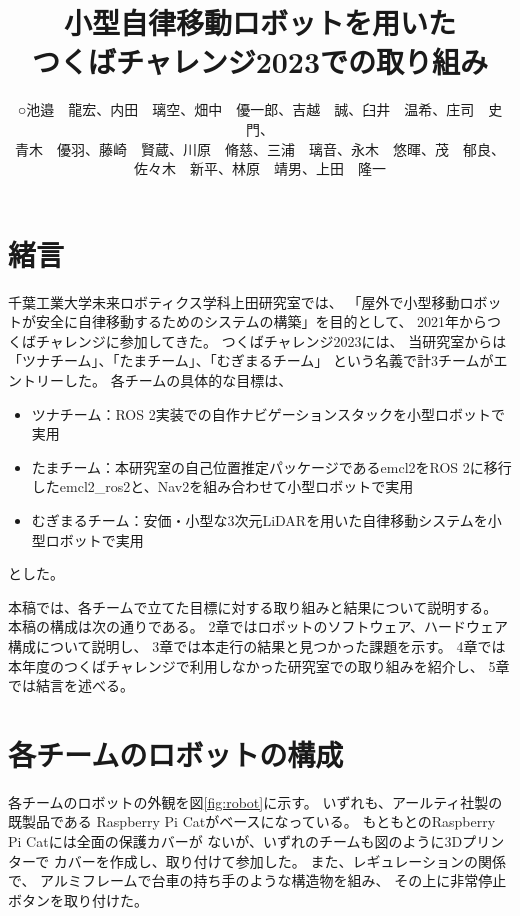 \documentclass[twocolumn,9pt]{jsproceedings}
\title{小型自律移動ロボットを用いた\\つくばチャレンジ2023での取り組み}
\author{○池邉　龍宏\authorrefmark{2}、内田　璃空\authorrefmark{2}、畑中　優一郎\authorrefmark{2}、吉越　誠\authorrefmark{1}、臼井　温希\authorrefmark{1}、庄司　史門\authorrefmark{1}、
\\青木　優羽\authorrefmark{1}、藤崎　賢蔵\authorrefmark{1}、川原　脩慈\authorrefmark{1}、三浦　璃音\authorrefmark{1}、永木　悠暉\authorrefmark{1}、茂　郁良\authorrefmark{1}、
\\佐々木　新平\authorrefmark{1}、林原　靖男\authorrefmark{1}、上田　隆一\authorrefmark{1}}
\affiliation{千葉工業大学 未来ロボティクス学科 ツナチーム/たまチーム/むぎまるチーム}
\begin{document}
\maketitle


\section{緒言}

千葉工業大学未来ロボティクス学科上田研究室では、
「屋外で小型移動ロボットが安全に自律移動するためのシステムの構築」を目的として、
2021年からつくばチャレンジに参加してきた。
つくばチャレンジ2023には、
当研究室からは「ツナチーム」、「たまチーム」、「むぎまるチーム」
という名義で計3チームがエントリーした。
各チームの具体的な目標は、
\begin{itemize}
  \item ツナチーム：ROS 2実装での自作ナビゲーションスタックを小型ロボットで実用
  \item たまチーム：本研究室の自己位置推定パッケージであるemcl2\cite{emcl2}をROS 2に移行したemcl2\_ros2\cite{emcl2_ros2}と、Nav2を組み合わせて小型ロボットで実用
  \item むぎまるチーム：安価・小型な3次元LiDARを用いた自律移動システムを小型ロボットで実用
\end{itemize}
とした。


本稿では、各チームで立てた目標に対する取り組みと結果について説明する。
本稿の構成は次の通りである。
2章ではロボットのソフトウェア、ハードウェア構成について説明し、
3章では本走行の結果と見つかった課題を示す。
4章では本年度のつくばチャレンジで利用しなかった研究室での取り組みを紹介し、
5章では結言を述べる。

\section{各チームのロボットの構成}

各チームのロボットの外観を図\ref{fig:robot}に示す。
いずれも、アールティ社製の既製品である
Raspberry Pi Cat\cite{RTshop}がベースになっている。
もともとのRaspberry Pi Catには全面の保護カバーが
ないが、いずれのチームも図のように3Dプリンターで
カバーを作成し、取り付けて参加した。
また、レギュレーションの関係で、
アルミフレームで台車の持ち手のような構造物を組み、
その上に非常停止ボタンを取り付けた。
\end{document}
